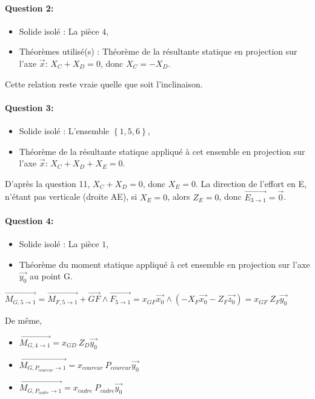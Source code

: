 \paragraph{Question 2:}

\begin{itemize}
 \item Solide isolé : La pièce $4$,
 \item Théorèmes utilisé(s) : Théorème de la résultante statique en projection sur l'axe $\overrightarrow{x}$: $X_C+X_D=0$, donc $X_C=-X_D$.
\end{itemize}

Cette relation reste vraie quelle que soit l'inclinaison.

\paragraph{Question 3:}

\begin{itemize}
 \item Solide isolé : L'ensemble $\left\{1,5,6 \right\}$,
 \item Théorème de la résultante statique appliqué à cet ensemble en projection sur l'axe $\overrightarrow{x}$: $X_C+X_D+X_E=0$.
\end{itemize}

D'après la question 11, $X_C+X_D=0$, donc $X_E=0$. La direction de l'effort en E, n'étant pas verticale (droite AE), si $X_E=0$, alors $Z_E=0$, donc $\overrightarrow{E_{3\rightarrow 1}}=\overrightarrow{0}$.

\paragraph{Question 4:}

\begin{itemize}
 \item Solide isolé : La pièce $1$,
 \item Théorème du moment statique appliqué à cet ensemble en projection sur l'axe $\overrightarrow{y_0}$ au point G.
\end{itemize}

$\overrightarrow{M_{G,5\to 1}}=\overrightarrow{M_{F,5\to 1}}+\overrightarrow{GF}\wedge\overrightarrow{F_{5\to 1}}=x_{GF}\overrightarrow{x_0}\wedge(-X_{F}\overrightarrow{x_0}-Z_{F}\overrightarrow{z_0})=x_{GF}~Z_{F}\overrightarrow{y_0}$

De même,
\begin{itemize}
 \item $\overrightarrow{M_{G,4\to 1}}=x_{GD}~Z_{D}\overrightarrow{y_0}$
 \item $\overrightarrow{M_{G,P_{coureur}\to 1}}=x_{coureur}~P_{coureur}\overrightarrow{y_0}$
 \item $\overrightarrow{M_{G,P_{cadre}\to 1}}=x_{cadre}~P_{cadre}\overrightarrow{y_0}$
\end{itemize}

